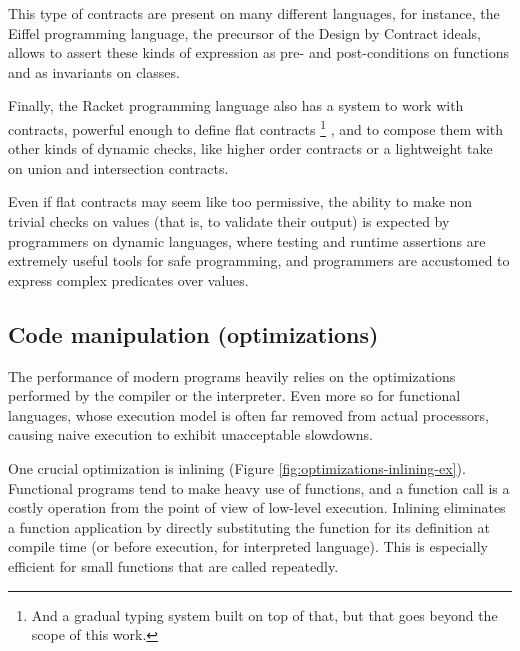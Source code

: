 \documentclass[sigplan,10pt,review,anonymous]{acmart}
\newcommand{\info}[2][1=]{}
\newcommand{\resolved}[2]{}
\begin{document}
This type of contracts are present on many different languages,
for instance, the Eiffel programming language\cite{meyer1987eiffel}, the precursor
of the Design by Contract ideals, allows to assert
these kinds of expression as pre- and post-conditions on
functions and as invariants on classes\cite{EiffelDesignByContract}.
\resolved{I (Arnaud) believe Eiffel has this feature as well,
  doesn't it? (Teo) You're right},


Finally, the Racket programming language also has a system to work with
contracts, powerful enough to define flat contracts
\footnote{And a gradual typing system
built on top of that, but that goes beyond the scope of this
work.}
, and
to compose them with other kinds of dynamic checks,
like higher order contracts or a lightweight take on union
and intersection contracts\cite{RacketContracts}.

Even if flat contracts may seem like too permissive, the ability to make
non trivial checks on values (that is, to validate their output) is expected
by programmers on dynamic languages, where testing and runtime
assertions are extremely useful tools for safe programming, and
programmers are accustomed to express complex predicates
over values.


\subsection*{Code manipulation (optimizations)}
\label{sec:optimizations}
\info{Present inlining and CSE as two major code
optimizations.
Purity and immutability as two important factors.}

The performance of modern programs heavily relies on the optimizations performed
by the compiler or the interpreter. Even more so for functional languages, whose
execution model is often far removed from actual processors, causing naive
execution to exhibit unacceptable slowdowns.

One crucial optimization is
inlining (Figure \ref{fig:optimizations-inlining-ex}). Functional programs tend
to make heavy use of functions, and a function call is a costly operation from
the point of view of low-level execution. Inlining eliminates a function
application by directly substituting the function for its definition at compile
time (or before execution, for interpreted language). This is especially
efficient for small functions that are called repeatedly.
\end{document}
